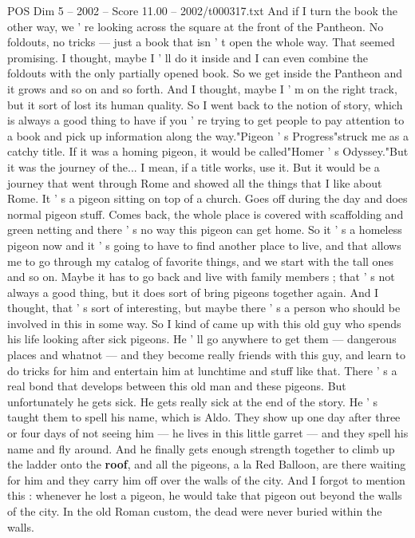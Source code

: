 \begin{textsample}{POS Dim 5 – 2002 – Score 11.00 – 2002/t000317.txt}
And if I turn the book the other way, we ' re looking across the square at the front of the Pantheon.
No foldouts, no tricks — just a book that isn ' t open the whole way.
That seemed promising.
I thought, maybe I ' ll do it inside and I can even combine the foldouts with the only partially opened book.
So we get inside the Pantheon and it grows and so on and so forth.
And I thought, maybe I ' m on the right track, but it sort of lost its human quality.
So I went back to the notion of story, which is always a good thing to have if you ' re trying to get people to pay attention to a book and pick up information along the way."Pigeon ' s Progress"struck me as a catchy title.
If it was a homing pigeon, it would be called"Homer ' s Odyssey."But it was the journey of the...
I mean, if a title works, use it.
But it would be a journey that went through Rome and showed all the things that I like about Rome.
It ' s a pigeon sitting on top of a church.
Goes off during the day and does normal pigeon stuff.
Comes back, the whole place is covered with scaffolding and green netting and there ' s no way this pigeon can get home.
So it ' s a homeless pigeon now and it ' s going to have to find another place to live, and that allows me to go through my catalog of favorite things, and we start with the tall ones and so on.
Maybe it has to go back and live with family members ; that ' s not always a good thing, but it does sort of bring pigeons together again.
And I thought, that ' s sort of interesting, but maybe there ' s a person who should be involved in this in some way.
So I kind of came up with this old guy who spends his life looking after sick pigeons.
He ' ll go anywhere to get them — dangerous places and whatnot — and they become really friends with this guy, and learn to do tricks for him and entertain him at lunchtime and stuff like that.
There ' s a real bond that develops between this old man and these pigeons.
But unfortunately he gets sick.
He gets really sick at the end of the story.
He ' s taught them to spell his name, which is Aldo.
They show up one day after three or four days of not seeing him — he lives in this little garret — and they spell his name and fly around.
And he finally gets enough strength together to climb up the ladder onto the \textbf{roof}, and all the pigeons, a la Red Balloon, are there waiting for him and they carry him off over the walls of the city.
And I forgot to mention this : whenever he lost a pigeon, he would take that pigeon out beyond the walls of the city.
In the old Roman custom, the dead were never buried within the walls.

\end{textsample}
